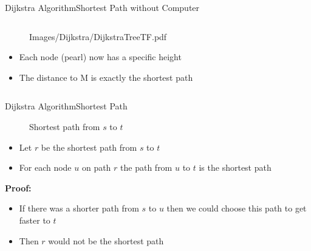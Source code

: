 \begin{frame}{Dijkstra Algorithm}{Shortest Path without Computer}
\begin{columns}
\begin{column}{0.5\linewidth}
\begin{figure}[!t]
          {Images/Dijkstra/DijkstraTreeTF.pdf}
        \vspace{-0.5em}
      \end{figure}
      \begin{itemize}
        \item
          Each node (pearl) now has a specific height
        \item
          The distance to M is exactly the {\color{Mittel-Blau}shortest path}
        \end{itemize}
    \end{column}
  \end{columns}
\end{frame}


\begin{frame}{Dijkstra Algorithm}{Shortest Path}
  \vspace{-1.5em}
  \begin{figure}
    \begin{adjustbox}{width=0.75\linewidth}
      
    \end{adjustbox}
    \label{fig:dijkstra:shortest_path_introduction}
    \caption{Shortest path from {\color{Mittel-Blau}$s$} to
    {\color{Mittel-Blau}$t$}}
  \end{figure}
  \vspace{-1.5em}
  \begin{itemize}
    \item
      Let {\color{Mittel-Gruen}$r$} be the shortest path from
      {\color{Mittel-Blau}$s$} to {\color{Mittel-Blau}$t$}
    \item
      For each node {\color{Mittel-Blau}$u$} on path {\color{Mittel-Gruen}$r$}
      the path from {\color{Mittel-Blau}$u$} to {\color{Mittel-Blau}$t$} is
      the shortest path
  \end{itemize}
  \textbf{Proof:}
  \begin{itemize}
    \item
      If there was a shorter path from {\color{Mittel-Blau}$s$} to
      {\color{Mittel-Blau}$u$} then we could choose this path to get faster to
      {\color{Mittel-Blau}$t$}
    \item
      Then {\color{Mittel-Gruen}$r$} would not be the shortest path
  \end{itemize}
\end{frame}


